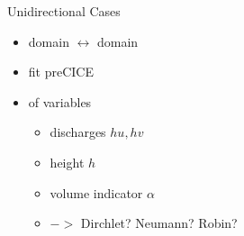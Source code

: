 \begin{frame}
\vspace{-2mm}
{\large Unidirectional Cases}\\
\begin{multicols}{2}
\begin{itemize}
\setlength\itemsep{2em}
\item {} domain $\leftrightarrow$  domain
\item fit  preCICE
\item {} of variables
\begin{itemize}
\setlength\itemsep{1em}
\vspace{5pt}
\item discharges $hu, hv$
\item height $h$
\item volume indicator $\alpha$
\item {} $->$ Dirchlet? Neumann? Robin?
\end{itemize}
\end{itemize}

\vfill\columnbreak


\end{multicols}
\end{frame}
